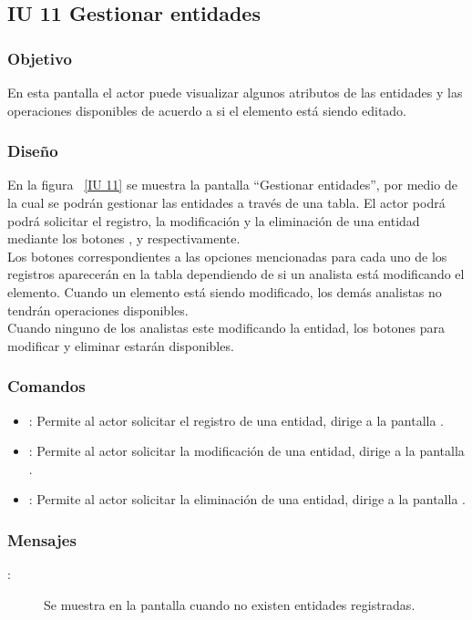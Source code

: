 \subsection{IU 11 Gestionar entidades}
\subsubsection{Objetivo}
	
	En esta pantalla el actor puede visualizar algunos atributos de las entidades y las operaciones disponibles de acuerdo a si el elemento está siendo editado.

\subsubsection{Diseño}

    En la figura ~\ref{IU 11} se muestra la pantalla ``Gestionar entidades'', por medio de la cual 
    se podrán gestionar las entidades a través de una tabla.
    El actor podrá podrá solicitar el registro, la modificación y la eliminación de una entidad mediante los botones
    , \btnEditar y \btnEliminar respectivamente. \\
    
    Los botones correspondientes a las opciones mencionadas para cada uno de los registros aparecerán en la tabla dependiendo de si 
    un analista está modificando el elemento. Cuando un elemento está siendo modificado, los demás analistas no tendrán operaciones disponibles.\\
   
    Cuando ninguno de los analistas este modificando la entidad, los botones para modificar y eliminar estarán disponibles.
    


\subsubsection{Comandos}
\begin{itemize}
	\item {}: Permite al actor solicitar el registro de una entidad, dirige a la pantalla .
	\item \btnEditar[Modificar]: Permite al actor solicitar la modificación de una entidad, dirige a la pantalla .
	\item \btnEliminar[Eliminar]: Permite al actor solicitar la eliminación de una entidad, dirige a la pantalla .
\end{itemize}

\subsubsection{Mensajes}

	
\begin{description}
	\item[:] Se muestra en la pantalla  cuando no existen entidades registradas.
\end{description}
